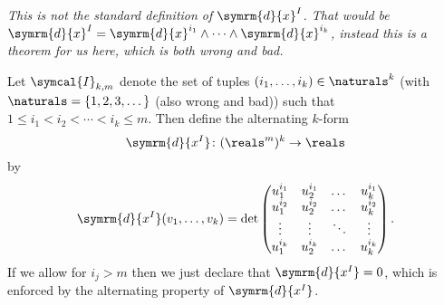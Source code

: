 \documentclass[fleqn]{NotesClass}
\renewcommand{\dl}{\symrm{d}}
\begin{document}
    \begin{dfn}{}{}
        \textit{This is not the standard definition of \(\dl{x}^I\). That would be \(\dl{x}^I = \dl{x}^{i_1} \wedge \dotsm \wedge \dl{x}^{i_k}\), instead this is a theorem for us here, which is both wrong and bad.}
        
        Let \(\symcal{I}_{k,m}\) denote the set of tuples \((i_1, \dotsc, i_k) \in \naturals^k\) (with \(\naturals = \{1, 2, 3, \dotsc\}\) (also wrong and bad)) such that \(1 \le i_1 < i_2 < \dotsb < i_k \le m\).
        Then define the alternating \(k\)-form
        \begin{equation}
            \dl{x^I} \colon (\reals^m)^k \to \reals
        \end{equation}
        by
        \begin{equation}
            \dl{x^I}(v_1, \dotsc, v_k) = \det
            \begin{pmatrix}
                u_1^{i_1} & u_2^{i_1} & \dots & u_k^{i_1}\\
                u_1^{i_2} & u_2^{i_2} & \dots & u_k^{i_2}\\
                \vdots & \vdots & \ddots & \vdots\\
                u_1^{i_k} & u_2^{i_k} & \dots & u_k^{i_k}
            \end{pmatrix}
            .
        \end{equation}
        If we allow for \(i_j > m\) then we just declare that \(\dl{x^I} = 0\), which is enforced by the alternating property of \(\dl{x^I}\).
    \end{dfn}
    
\end{document}
